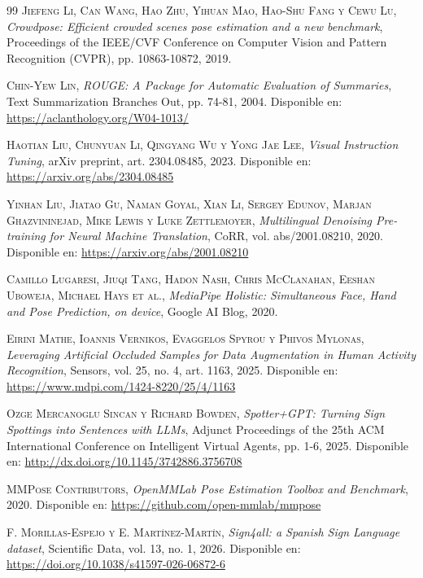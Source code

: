 \begin{thebibliography}{99}
 \textsc{Jiefeng Li, Can Wang, Hao Zhu, Yihuan Mao, Hao-Shu Fang y Cewu Lu}, \textit{Crowdpose: Efficient crowded scenes pose estimation and a new benchmark}, Proceedings of the IEEE/CVF Conference on Computer Vision and Pattern Recognition (CVPR), pp. 10863-10872, 2019.

 \textsc{Chin-Yew Lin}, \textit{ROUGE: A Package for Automatic Evaluation of Summaries}, Text Summarization Branches Out, pp. 74-81, 2004. Disponible en: \url{https://aclanthology.org/W04-1013/}

 \textsc{Haotian Liu, Chunyuan Li, Qingyang Wu y Yong Jae Lee}, \textit{Visual Instruction Tuning}, arXiv preprint, art. 2304.08485, 2023. Disponible en: \url{https://arxiv.org/abs/2304.08485}

 \textsc{Yinhan Liu, Jiatao Gu, Naman Goyal, Xian Li, Sergey Edunov, Marjan Ghazvininejad, Mike Lewis y Luke Zettlemoyer}, \textit{Multilingual Denoising Pre-training for Neural Machine Translation}, CoRR, vol. abs/2001.08210, 2020. Disponible en: \url{https://arxiv.org/abs/2001.08210}

 \textsc{Camillo Lugaresi, Jiuqi Tang, Hadon Nash, Chris McClanahan, Eeshan Uboweja, Michael Hays et al.}, \textit{MediaPipe Holistic: Simultaneous Face, Hand and Pose Prediction, on device}, Google AI Blog, 2020.

 \textsc{Eirini Mathe, Ioannis Vernikos, Evaggelos Spyrou y Phivos Mylonas}, \textit{Leveraging Artificial Occluded Samples for Data Augmentation in Human Activity Recognition}, Sensors, vol. 25, no. 4, art. 1163, 2025. Disponible en: \url{https://www.mdpi.com/1424-8220/25/4/1163}

 \textsc{Ozge Mercanoglu Sincan y Richard Bowden}, \textit{Spotter+GPT: Turning Sign Spottings into Sentences with LLMs}, Adjunct Proceedings of the 25th ACM International Conference on Intelligent Virtual Agents, pp. 1-6, 2025. Disponible en: \url{http://dx.doi.org/10.1145/3742886.3756708}

 \textsc{MMPose Contributors}, \textit{OpenMMLab Pose Estimation Toolbox and Benchmark}, 2020. Disponible en: \url{https://github.com/open-mmlab/mmpose}

 \textsc{F. Morillas-Espejo y E. Martínez-Martín}, \textit{Sign4all: a Spanish Sign Language dataset}, Scientific Data, vol. 13, no. 1, 2026. Disponible en: \url{https://doi.org/10.1038/s41597-026-06872-6}


\end{thebibliography}
